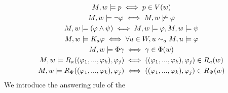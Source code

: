 \begin{gather*}
	M, w |= p \iff p \in V(w) \\
	M, w |= \neg\varphi \iff M, w \not\models \varphi\\
	M, w |= (\varphi \land \psi) \iff M, w |= \varphi, M, w |= \psi \\
	M, w |= K_a\varphi \iff \forall u\in W, u \sim_{a} M, u |= \varphi \\
	M, w |= \Phi\gamma \iff \gamma \in \Phi(w) \\
	M, w |= R_a((\varphi_1,...,\varphi_k), \varphi_j) \iff ((\varphi_1,...,\varphi_k), \varphi_j) \in R_a(w) \\
	M, w |= R_\Psi((\varphi_1,...,\varphi_k), \varphi_j) \iff ((\varphi_1,...,\varphi_k), \varphi_j) \in R_\Psi(w)
\end{gather*}
We introduce the answering rule of the 
